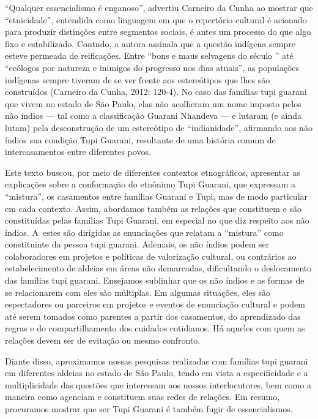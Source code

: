 ``Qualquer essencialismo é enganoso'', advertiu Carneiro da Cunha ao
mostrar que ``etnicidade'', entendida como linguagem em que o repertório
cultural é acionado para produzir distinções entre segmentos sociais, é
antes um processo do que algo fixo e estabilizado. Contudo, a autora
assinala que a questão indígena sempre esteve permeada de reificações.
Entre ``bons e maus selvagens do século '' até ``ecólogos por natureza
e inimigos do progresso nos dias atuais'', as populações indígenas
sempre tiveram de se ver frente aos estereótipos que lhes são
construídos (Carneiro da Cunha, 2012: 120-4). No caso das famílias tupi
guarani que vivem no estado de São Paulo, elas não acolheram um nome
imposto pelos não índios --- tal como a classificação Guarani Nhandeva ---
e lutaram (e ainda lutam) pela desconstrução de um estereótipo de
``indianidade'', afirmando aos não índios sua condição Tupi Guarani,
resultante de uma história comum de intercasamentos entre diferentes
povos. 

Este texto buscou, por meio de diferentes contextos etnográficos,
apresentar as explicações sobre a conformação do etnônimo Tupi Guarani,
que expressam a ``mistura'', os casamentos entre famílias Guarani e Tupi,
mas de modo particular em cada contexto. Assim, abordamos também as
relações que constituem e são constituídas pelas famílias Tupi Guarani,
em especial no que diz respeito aos não índios. A~estes são dirigidas
as enunciações que relatam a ``mistura'' como constituinte da pessoa tupi
guarani. Ademais, os não índios podem ser colaboradores em projetos e
políticas de valorização cultural, ou contrários ao estabelecimento de
aldeias em áreas não demarcadas, dificultando o deslocamento das
famílias tupi guarani. Ensejamos sublinhar que os não índios e as
formas de se relacionarem com eles são múltiplas. Em algumas situações,
eles são espectadores ou parceiros em projetos e eventos de enunciação
cultural e podem até serem tomados como parentes a partir dos
casamentos, do aprendizado das regras e do compartilhamento dos
cuidados cotidianos. Há aqueles com quem as relações devem ser de
evitação ou mesmo confronto.

Diante disso, aproximamos nossas pesquisas realizadas com famílias tupi
guarani em diferentes aldeias no estado de São Paulo, tendo em vista a
especificidade e a multiplicidade das questões que interessam aos
nossos interlocutores, bem como a maneira como agenciam e constituem
suas redes de relações. Em resumo, procuramos mostrar que ser Tupi
Guarani é também fugir de essencialismos.

